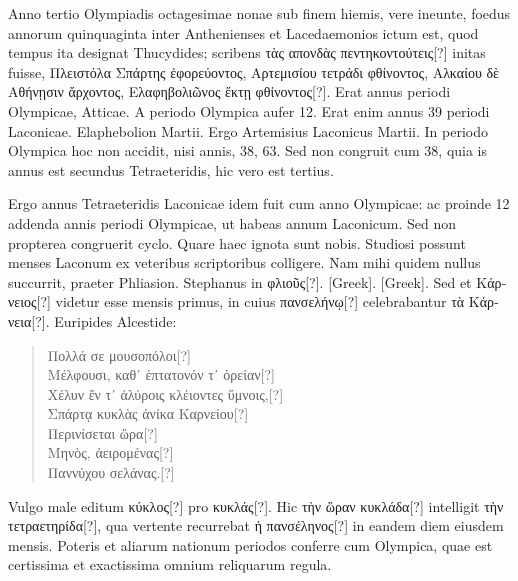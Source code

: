 Anno tertio Olympiadis octagesimae nonae sub finem hiemis,
vere ineunte, foedus annorum quinquaginta inter Anthenienses
et Lacedaemonios ictum est, quod tempus ita designat Thucydides;
scribens \textgreek{τὰς απονδὰς πεντηκοντούτεις[?]} initas fuisse,
 \textgreek{Πλειστόλα Σπάρτης
ἐφορεύοντος, Αρτεμισίου τετράδι φθίνοντος, Αλκαίου δὲ Αθήνῃσιν ἄρχοντος,
 Ελαφηβολιῶνος
ἕκτῃ φθἰνοντος[?]}.
Erat annus  periodi Olympicae,  Atticae.
A periodo Olympica aufer 12.
Erat enim annus 39 periodi Laconicae.
Elaphebolion  Martii.
Ergo Artemisius Laconicus  Martii.
In periodo Olympica hoc non accidit, nisi annis, 38, 63.
Sed non congruit
cum 38, quia is annus est secundus Tetraeteridis, hic vero est
tertius.

Ergo annus Tetraeteridis Laconicae idem fuit cum
 anno Olympicae:
ac proinde 12 addenda annis periodi Olympicae, ut habeas
annum Laconicum.
Sed non propterea congruerit cyclo.
Quare
haec ignota sunt nobis.
Studiosi possunt menses Laconum ex veteribus
scriptoribus colligere.
Nam mihi quidem nullus succurrit, praeter
Phliasion.
Stephanus in \textgreek{φλιοῦς[?]}.
\textgreek{[Greek]}.
\textgreek{[Greek]}.
Sed et \textgreek{Κάρνειος[?]} videtur esse mensis primus,
in cuius \textgreek{πανσελήνῳ[?]} celebrabantur \textgreek{τὰ Κάρνεια[?]}.
Euripides Alcestide:
\begin{verse}
  \textgreek{Πολλά σε μουσοπόλοι[?]}\\
  \textgreek{Μέλφουσι, καθ᾽ ἑπτατονόν τ᾽ ὀρείαν[?]}\\
  \textgreek{Χέλυν ἔν τ᾿ ἀλύροις κλέιοντες ὕμνοις,[?]}\\
  \textgreek{Σπάρτᾳ κυκλὰς ἁνίκα Καρνείου[?]}\\
  \textgreek{Περινίσεται ὥρα[?]}\\
  \textgreek{Μηνὸς, ἀειρομένας[?]}\\
  \textgreek{Παννύχου σελάνας.[?]}
\end{verse}
Vulgo male editum \textgreek{κύκλος[?]} pro \textgreek{κυκλάς[?]}.
Hic \textgreek{τὴν ὥραν κυκλάδα[?]} intelligit
\textgreek{τὴν τετραετηρίδα[?]}, qua vertente recurrebat
 \textgreek{ἡ πανσέληνος[?]} in eandem
diem eiusdem mensis.
Poteris et aliarum nationum periodos
conferre cum Olympica, quae est certissima et exactissima omnium
reliquarum regula.


